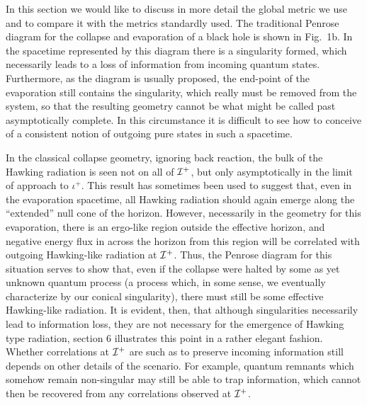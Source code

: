 \bigskip
{}
\medskip
In this section we would like to discuss in more detail the global
metric we use and to compare it with the metrics standardly used.
The traditional Penrose diagram  for the collapse and evaporation of a
black hole is shown in Fig.~1b. In the spacetime represented by this
diagram there is a singularity formed, which necessarily leads to a
loss of information from incoming quantum states. Furthermore, as the
diagram is usually proposed, the end-point of the evaporation still
contains the singularity, which really must be removed from the system,
so that the resulting geometry cannot be what might be called past
asymptotically complete. In this circumstance it is difficult to see
how to conceive of a consistent notion of outgoing pure states in
such a spacetime.

In the classical collapse geometry, ignoring back reaction, the
bulk of the Hawking radiation is seen not on all of $\cal{I}^+$, but
only asymptotically in the limit of approach to $\iota^+$. This result
has sometimes been used to suggest that, even in the evaporation
spacetime, all Hawking radiation should again emerge along the
``extended'' null cone of the horizon. However, necessarily in the
geometry for this evaporation, there is an ergo-like region outside the
effective horizon, and negative energy flux in across the horizon from
this region will be correlated with outgoing Hawking-like radiation at
$\cal{I}^+$. Thus, the Penrose diagram for this situation serves to
show that, even if the collapse were halted by some as yet unknown
quantum process (a process which, in some sense, we eventually
characterize by our conical singularity), there must still be some
effective Hawking-like radiation.  It is evident, then, that although
singularities necessarily lead to information loss, they are not
necessary for the emergence of Hawking type radiation, section 6
illustrates this point in a rather elegant fashion. Whether correlations
at $\cal{I}^+$ are such as to preserve incoming information still
depends on other details of the scenario. For example, quantum remnants
which somehow remain non-singular may still be able to trap
information, which cannot then be recovered from any correlations
observed at $\cal{I}^+$.

